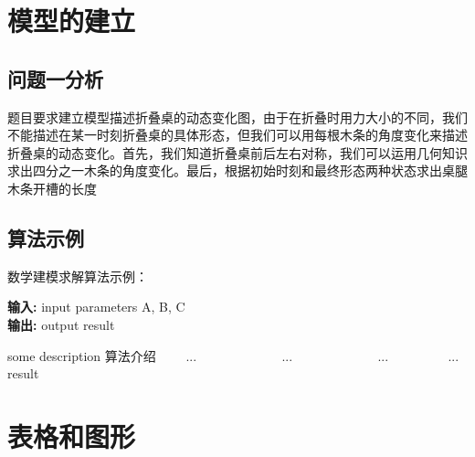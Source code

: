 \documentclass[bwprint]{gmcmthesis}
\begin{document}


\section{模型的建立}

\subsection{问题一分析}
题目要求建立模型描述折叠桌的动态变化图，由于在折叠时用力大小的不同，我们不能描述在某一时刻折叠桌的具体形态，但我们可以用每根木条的角度变化来描述折叠桌的动态变化。首先，我们知道折叠桌前后左右对称，我们可以运用几何知识求出四分之一木条的角度变化。最后，根据初始时刻和最终形态两种状态求出桌腿木条开槽的长度


\subsection{算法示例}

数学建模求解算法示例：
\begin{center}
\begin{minipage}{0.8\textwidth}
\begin{algorithm}[H]%
\caption{算法的名字} %
{\bf 输入:} %
input parameters A, B, C\\
{\bf 输出:} %
output result
\begin{algorithmic}[1]
\State some description 算法介绍 %
　　\State ...
　　　　\State ...
　　\Else
　　　　\State ...
　　\EndIf
\EndFor
{} %
　　\State ...
\EndWhile
\State \Return result
\end{algorithmic}
\end{algorithm}
\end{minipage}
\end{center}
\vspace{2ex}

\section{表格和图形}
\end{document}

